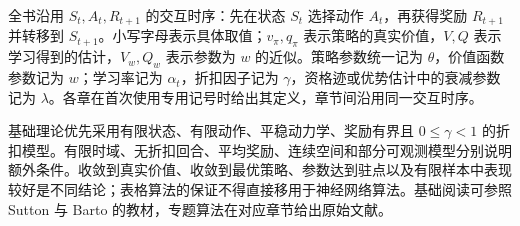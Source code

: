全书沿用 $S_t,A_t,R_{t+1}$ 的交互时序：先在状态 $S_t$ 选择动作 $A_t$，再获得奖励 $R_{t+1}$ 并转移到 $S_{t+1}$。小写字母表示具体取值；$v_\pi,q_\pi$ 表示策略的真实价值，$V,Q$ 表示学习得到的估计，$V_w,Q_w$ 表示参数为 $w$ 的近似。策略参数统一记为 $\theta$，价值函数参数记为 $w$；学习率记为 $\alpha_t$，折扣因子记为 $\gamma$，资格迹或优势估计中的衰减参数记为 $\lambda$。各章在首次使用专用记号时给出其定义，章节间沿用同一交互时序。

基础理论优先采用有限状态、有限动作、平稳动力学、奖励有界且 $0\leq\gamma<1$ 的折扣模型。有限时域、无折扣回合、平均奖励、连续空间和部分可观测模型分别说明额外条件。收敛到真实价值、收敛到最优策略、参数达到驻点以及有限样本中表现较好是不同结论；表格算法的保证不得直接移用于神经网络算法。基础阅读可参照 Sutton 与 Barto 的教材\cite{sutton-barto}，专题算法在对应章节给出原始文献。

